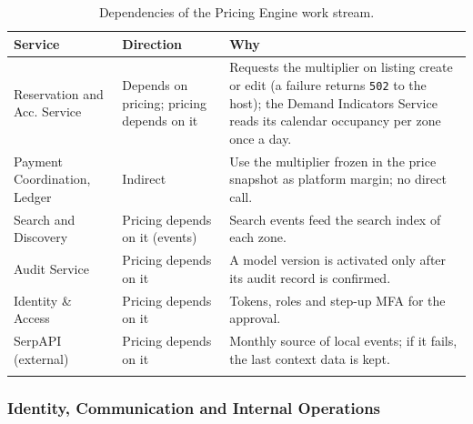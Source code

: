 \begin{longtable}{@{}L{3.2cm}L{2.8cm}L{7.8cm}@{}}
\toprule
\textbf{Service} & \textbf{Direction} & \textbf{Why} \\
\midrule
\endhead
Reservation and Acc. Service & Depends on pricing; pricing depends on it &
  Requests the multiplier on listing create or edit (a failure returns
  \texttt{502} to the host); the Demand Indicators Service reads its
  calendar occupancy per zone once a day. \\
Payment Coordination, Ledger & Indirect &
  Use the multiplier frozen in the price snapshot as platform margin; no
  direct call. \\
Search and Discovery & Pricing depends on it (events) &
  Search events feed the search index of each zone. \\
Audit Service & Pricing depends on it &
  A model version is activated only after its audit record is confirmed. \\
Identity \& Access & Pricing depends on it &
  Tokens, roles and step-up MFA for the approval. \\
SerpAPI (external) & Pricing depends on it &
  Monthly source of local events; if it fails, the last context data is kept. \\
\bottomrule
\caption{Dependencies of the Pricing Engine work stream.}
\label{tab:price-dependencies}
\end{longtable}
\endgroup

\begingroup
\setlength{\emergencystretch}{3em}
\subsubsection{Identity, Communication and Internal Operations}
\label{sec:id-dependencies}

